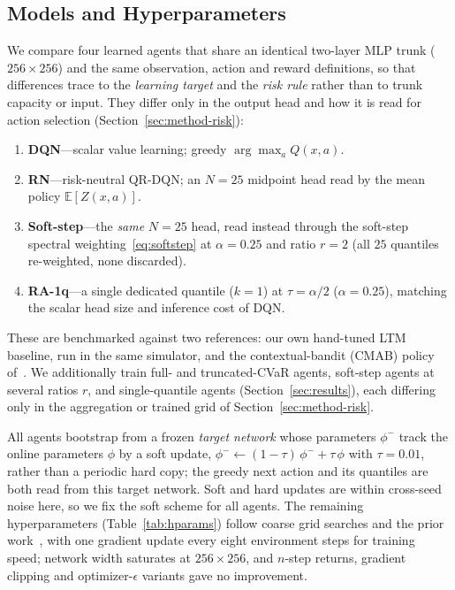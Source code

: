\documentclass[conference]{IEEEtran}
\begin{document}
\subsection{Models and Hyperparameters}
We compare four learned agents that share an identical two-layer MLP trunk
($256\times256$) and the same observation, action and reward definitions, so that
differences trace to the \emph{learning target} and the \emph{risk rule} rather
than to trunk capacity or input. They differ only in the output head and how it
is read for action selection (Section~\ref{sec:method-risk}):
\begin{enumerate}
    \item \textbf{DQN}---scalar value learning; greedy $\arg\max_a Q(x,a)$.
    \item \textbf{RN}---risk-neutral QR-DQN; an $N{=}25$ midpoint head read by the
    mean policy $\mathbb{E}[Z(x,a)]$.
    \item \textbf{Soft-step}---the \emph{same} $N{=}25$ head, read instead through
    the soft-step spectral weighting~\eqref{eq:softstep} at $\alpha{=}0.25$ and
    ratio $r{=}2$ (all $25$ quantiles re-weighted, none discarded).
    \item \textbf{RA-1q}---a single dedicated quantile ($k{=}1$) at
    $\tau{=}\alpha/2$ ($\alpha{=}0.25$), matching the scalar head size and
    inference cost of DQN.
\end{enumerate}
These are benchmarked against two references: our own hand-tuned LTM baseline,
run in the same simulator, and the contextual-bandit (CMAB) policy
of~\cite{cmab_ho}. We additionally train full- and truncated-CVaR agents,
soft-step agents at several ratios $r$, and single-quantile agents
(Section~\ref{sec:results}), each differing only in the aggregation or trained
grid of Section~\ref{sec:method-risk}.

All agents bootstrap from a frozen \emph{target network} whose parameters
$\phi^{-}$ track the online parameters $\phi$ by a soft update,
$\phi^{-}\!\leftarrow(1{-}\tau)\,\phi^{-}+\tau\,\phi$ with $\tau{=}0.01$, rather
than a periodic hard copy; the greedy next action and its quantiles are both read
from this target network.
Soft and hard updates are within cross-seed noise here, so we fix the soft scheme
for all agents. The remaining hyperparameters (Table~\ref{tab:hparams}) follow
coarse grid searches and the prior work~\cite{cmab_ho}, with one gradient update
every eight environment steps for training speed; network width saturates at
$256\times256$, and $n$-step returns, gradient clipping and optimizer-$\epsilon$
variants gave no improvement.
\end{document}
